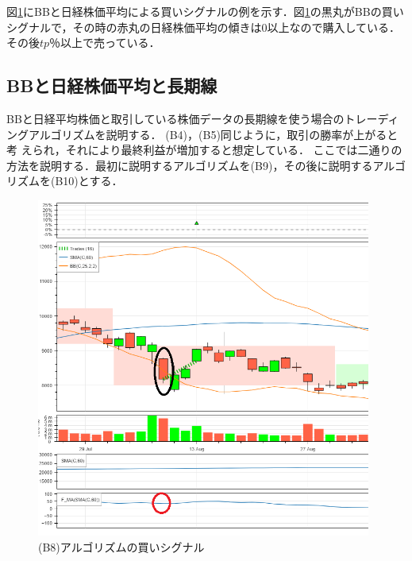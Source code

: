    図\ref{fig:bbnk}にBBと日経株価平均による買いシグナルの例を示す．図\ref{fig:bbnk}の黒丸がBBの買いシグナルで，その時の赤丸の日経株価平均の傾きは0以上なので購入している．その後$tp$％以上で売っている．

\subsection{BBと日経株価平均と長期線}
BBと日経平均株価と取引している株価データの長期線を使う場合のトレーディングアルゴリズムを説明する． (B4)，(B5)同じように，取引の勝率が上がると考
えられ，それにより最終利益が増加すると想定している．
ここでは二通りの方法を説明する．最初に説明するアルゴリズムを(B9)，その後に説明するアルゴリズムを(B10)とする．
\begin{figure}[t]
  \centering
  \includegraphics[width=110mm]{fig/bb_nk_paint.png}
  \caption{(B8)アルゴリズムの買いシグナル}
  \label{fig:bbnk}
 \end{figure}
